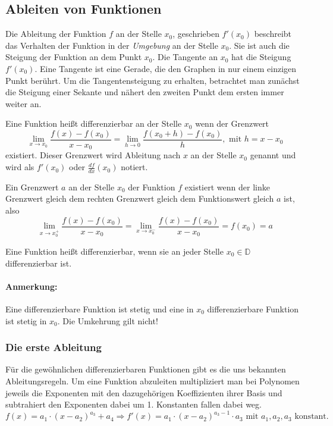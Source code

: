 \subsection{Ableiten von Funktionen}
Die Ableitung der Funktion $f$ an der Stelle $x_0$, geschrieben $f'(x_0)$ beschreibt das Verhalten der Funktion in der \textit{Umgebung} an der Stelle $x_0$. Sie ist auch die Steigung der Funktion an dem Punkt $x_0$. Die Tangente an $x_0$ hat die Steigung $f'(x_0)$. Eine Tangente ist eine Gerade, die den Graphen in nur einem einzigen Punkt berührt. Um die Tangentensteigung zu erhalten, betrachtet man zunächst die Steigung einer Sekante und nähert den zweiten Punkt dem ersten immer weiter an.
\begin{definition}[Differenzierbarkeit in $x_0$]
Eine Funktion heißt differenzierbar an der Stelle $x_0$ wenn der Grenzwert
\begin{equation*}
 \lim\limits_{x \to x_0} \frac{f(x)-f(x_0)}{x-x_0} = \lim\limits_{h \to 0}  \frac{f(x_0 + h)-f(x_0)}{h} , \text{ mit } h = x - x_0
\end{equation*}
existiert. Dieser Grenzwert wird Ableitung nach $x$ an der Stelle $x_0$ genannt und wird als $f'(x_0)$ oder $\frac{df}{dx}(x_0)$ notiert.
\end{definition}
Ein Grenzwert $a$ an der Stelle $x_0$ der Funktion $f$ existiert wenn der linke Grenzwert gleich dem rechten Grenzwert gleich dem Funktionswert gleich $a$ ist, also
\begin{equation*}
 \lim\limits_{x \to x_0^+} \frac{f(x)-f(x_0)}{x-x_0} =  \lim\limits_{x \to x_0^-} \frac{f(x)-f(x_0)}{x-x_0} = f(x_0) = a
\end{equation*}

\begin{definition}[Differenzierbarkeit]
Eine Funktion heißt differenzierbar, wenn sie an jeder Stelle $x_0 \in \mathbb{D}$ differenzierbar ist.
\end{definition}

\paragraph{Anmerkung:} Eine differenzierbare Funktion ist stetig und eine in $x_0$ differenzierbare Funktion ist stetig in $x_0$. Die Umkehrung gilt nicht!

\subsubsection{Die erste Ableitung}
Für die gewöhnlichen differenzierbaren Funktionen gibt es die uns bekannten Ableitungsregeln. Um eine Funktion abzuleiten multipliziert man bei Polynomen jeweils die Exponenten mit den dazugehörigen Koeffizienten ihrer Basis und subtrahiert den Exponenten dabei um 1. Konstanten fallen dabei weg.
\begin{equation*}
f(x) = a_1 \cdot (x-a_2)^{a_3} + a_4 \Rightarrow f'(x) = a_1 \cdot (x - a_2)^{a_3-1} \cdot a_3 \text{ mit } a_1,a_2,a_3 \text{ konstant.}
\end{equation*}

